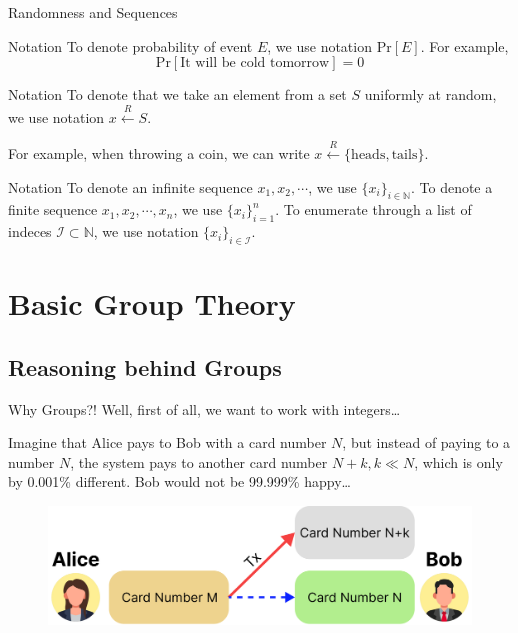 \documentclass{beamer}
\begin{document}
    \begin{frame}{Randomness and Sequences}
        \begin{block}{Notation}
          To denote probability of event $E$, we use notation $\text{Pr}[E]$. For example,
          \begin{equation*}
              \text{Pr}[\text{It will be cold tomorrow}] = 0
          \end{equation*}
        \end{block}

        \begin{block}{Notation}
            To denote that we take an element from a set $S$ uniformly at random, we use notation $x \xleftarrow{R} S$.

            For example, when throwing a coin, we can write $x \xleftarrow{R} \{\text{heads}, \text{tails}\}$.
        \end{block}

        \begin{block}{Notation}
          To denote an infinite sequence $x_1,x_2,\cdots$, we use $\{x_i\}_{i \in \mathbb{N}}$. To denote
          a finite sequence $x_1,x_2,\cdots,x_n$, we use $\{x_i\}_{i=1}^n$. To enumerate 
          through a list of indeces $\mathcal{I} \subset \mathbb{N}$, we use notation
          $\{x_i\}_{i \in \mathcal{I}}$.
        \end{block}
    \end{frame}

    \section{Basic Group Theory}

    \subsection{Reasoning behind Groups}
    \begin{frame}{Why Groups?!}
        Well, first of all, we want to work with integers\ldots

        Imagine that Alice pays to Bob with a card number $N$, but instead of paying to a number $N$, the system pays 
        to another card number $N+k, k \ll N$, which is only by 0.001\% different. Bob would not be 99.999\% happy\ldots

        \begin{figure}
          \includegraphics[width=1.0\textwidth]{images/lecture_1/why_integers.pdf}
          \label{fig:why_integers}
        \end{figure}
    \end{frame}
\end{document}
